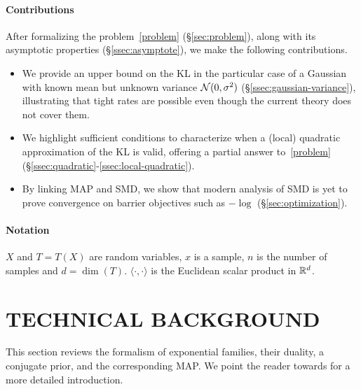 \documentclass[twoside]{article}
\begin{document}
\paragraph{Contributions}
After formalizing the problem~\eqref{problem} (\S\ref{sec:problem}), along with its asymptotic properties (\S\ref{ssec:asymptote}), we make the following contributions.
\begin{itemize}
	\itemsep0em
	\item We provide an upper bound on the KL in the particular case of a Gaussian with known mean but unknown variance ${\mathcal N}(0,\sigma^2)$ (\S\ref{ssec:gaussian-variance}), illustrating that tight rates are possible even though the current theory does not cover them.
	\item We highlight sufficient conditions to characterize when a (local) quadratic approximation of the KL is valid, offering a partial answer to~\eqref{problem} (\S\ref{ssec:quadratic}-\ref{ssec:local-quadratic}).
	\item By linking MAP and SMD, we show that modern analysis of SMD is yet to prove convergence on barrier objectives such as $-\log$ (\S\ref{sec:optimization}).
\end{itemize}


\paragraph{Notation}
$X$ and $T=T(X)$ are random variables, $x$ is a sample, $n$ is the number of samples and $d= \dim(T)$.
$\langle \cdot , \cdot \rangle$ is the Euclidean scalar product in $\mathbb{R}^d$.


\section{TECHNICAL BACKGROUND}
\label{sec:background}
This section reviews the formalism of exponential families, their duality, a conjugate prior, and the corresponding MAP.
We point the reader towards \citet[Chapter 3]{wainwright2008graphical} for a more detailed introduction.
\end{document}
